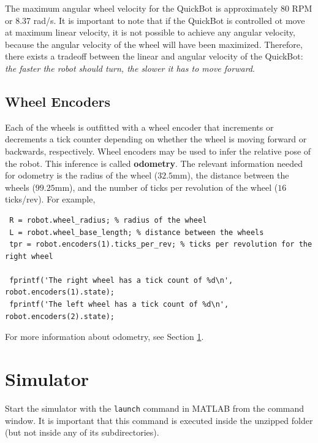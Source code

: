 \documentclass[10pt]{article}
\begin{document}
The maximum angular wheel velocity for the QuickBot is approximately 80 RPM or 8.37 rad/s. It is important to note that if the QuickBot is controlled ot move at maximum linear velocity, it is not possible to achieve any angular velocity, because the angular velocity of the wheel will have been maximized. Therefore, there exists a tradeoff between the linear and angular velocity of the QuickBot: \textit{the faster the robot should turn, the slower it has to move forward}.

\subsection{Wheel Encoders}

Each of the wheels is outfitted with a wheel encoder that increments or decrements a tick counter depending on whether the wheel is moving forward or backwards, respectively. Wheel encoders may be used to infer the relative pose of the robot. This inference is called \textbf{odometry}. The relevant information needed for odometry is the radius of the wheel ($32.5$mm), the distance between the wheels ($99.25$mm), and the number of ticks per revolution of the wheel ($16$ ticks/rev). For example,

\begin{verbatim}
 R = robot.wheel_radius; % radius of the wheel
 L = robot.wheel_base_length; % distance between the wheels
 tpr = robot.encoders(1).ticks_per_rev; % ticks per revolution for the right wheel

 fprintf('The right wheel has a tick count of %d\n', robot.encoders(1).state);
 fprintf('The left wheel has a tick count of %d\n', robot.encoders(2).state);
\end{verbatim}

For more information about odometry, see Section \ref{}.

\newpage
\section{Simulator}

Start the simulator with the \texttt{launch} command in MATLAB from the command window. It is important that this command is executed inside the unzipped folder (but not inside any of its subdirectories).
\end{document}
